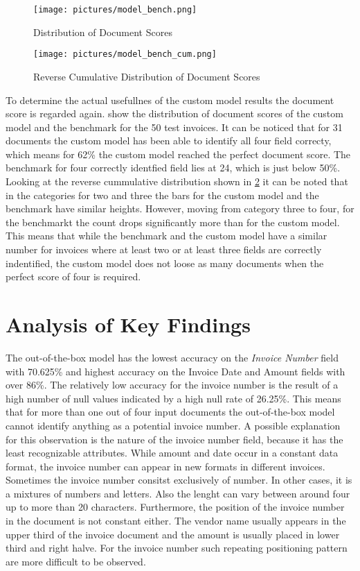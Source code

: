 \begin{figure}[!ht]
    \centering 
    \texttt{[image: pictures/model\_bench.png]}
    \caption{Distribution of Document Scores}
    \label{pic:model_bench}    %
\end{figure}
\begin{figure}[!ht]
    \centering 
    \texttt{[image: pictures/model\_bench\_cum.png]}
    \caption{Reverse Cumulative Distribution of Document Scores}
    \label{pic:model_bench_cum}    %
\end{figure}

To determine the actual usefullnes of the custom model results the document score is regarded again.
 show the distribution of document scores of the custom model and the benchmark for the 50 test invoices. 
It can be noticed that for 31 documents the custom model has been able to identify all four field correcty, which means for 62\% the custom model reached the perfect document score.
The benchmark for four correctly identfied field lies at 24, which is just below 50\%.
Looking at the reverse cummulative distribution shown in \cref{pic:model_bench_cum} it can be noted that
in the categories for two and three the bars for the custom model and the benchmark have similar heights.
However, moving from category three to four, for the benchmarkt the count drops significantly more than for the custom model.
This means that while the benchmark and the custom model have a similar number for invoices where at least two or at least three fields are correctly indentified,
the custom model does not loose as many documents when the perfect score of four is required.



\newpage
\section{Analysis of Key Findings}
The out-of-the-box model has the lowest accuracy on the \textit{Invoice Number} field with 70.625\% and highest accuracy on the Invoice Date and Amount fields with over 86\%. 
The relatively low accuracy for the invoice number is the result of a high number of null values indicated by a high null rate of 26.25\%. 
This means that for more than one out of four input documents the out-of-the-box model cannot identify anything as a potential invoice number. 
A possible explanation for this observation is the nature of the invoice number field, because it has the least recognizable attributes. 
While amount and date occur in a constant data format, the invoice number can appear in new formats in different invoices. Sometimes the invoice number consitst exclusively of number. 
In other cases, it is a mixtures of numbers and letters. Also the lenght can vary between around four up to more than 20 characters. 
Furthermore, the position of the invoice number in the document is not constant either. 
The vendor name usually appears in the upper third of the invoice document and the amount is usually placed in lower third and right halve.
For the invoice number such repeating positioning pattern are more difficult to be observed.

